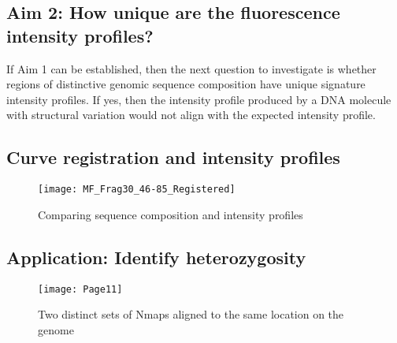 \documentclass[11pt]{extarticle} %
\begin{document}
\subsection*{Aim 2: How unique are the fluorescence intensity profiles?}
If Aim 1 can be established, then the next question to investigate is whether regions of distinctive genomic sequence composition have unique signature intensity profiles. If yes, then the intensity profile produced by a DNA molecule with structural variation would not align with the expected intensity profile. 

\subsection*{Curve registration and intensity profiles}
\begin{figure}[H]
	\centering
	\texttt{[image: MF\_Frag30\_46-85\_Registered]}
	\caption{Comparing sequence composition and intensity profiles}
	\label{fig:Fig2}
\end{figure}

\subsection*{Application: Identify heterozygosity}
\begin{figure}[H]
	\centering
	\texttt{[image: Page11]}
	\caption{Two distinct sets of Nmaps aligned to the same location on the genome}
	\label{fig:Fig3}
\end{figure}


%
%
\end{document}

